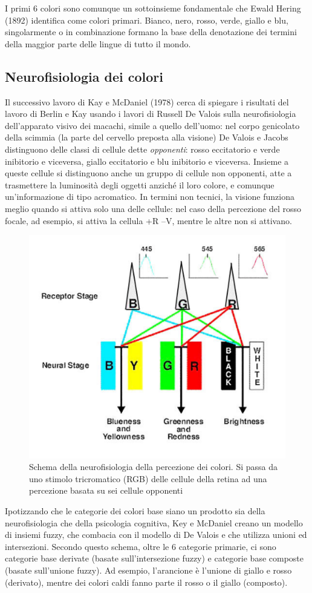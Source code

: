 I primi 6 colori sono comunque un sottoinsieme fondamentale che Ewald Hering (1892) identifica come colori primari. Bianco, nero, rosso, verde, giallo e blu, singolarmente o in combinazione formano la base della denotazione dei termini della maggior parte delle lingue di tutto il mondo.

\subsection{Neurofisiologia dei colori}
Il successivo lavoro di Kay e McDaniel (1978) cerca di spiegare i risultati del lavoro di Berlin e Kay usando i lavori di Russell De Valois sulla neurofisiologia dell’apparato visivo dei macachi, simile a quello dell’uomo: nel corpo genicolato della scimmia (la parte del cervello preposta alla visione) De Valois e Jacobs distinguono delle classi di cellule dette \emph{opponenti}: rosso eccitatorio e verde inibitorio e viceversa, giallo eccitatorio e blu inibitorio e viceversa. Insieme a queste cellule si distinguono anche un gruppo di cellule non opponenti, atte a trasmettere la luminosità degli oggetti anziché il loro colore, e comunque un’informazione di tipo acromatico. In termini non tecnici, la visione funziona meglio quando si attiva solo una delle cellule: nel caso della percezione del rosso focale, ad esempio, si attiva la cellula +R –V, mentre le altre non si attivano.

\begin{figure}[hbt]
  \centering
  \includegraphics[width=.5\textwidth]{img/neurofisiologia-colori.png}
  \caption{Schema della neurofisiologia della percezione dei colori. Si passa da uno stimolo tricromatico (RGB) delle cellule della retina ad una percezione basata su sei cellule opponenti}
  \label{fig:neurofisiologia}
\end{figure}

Ipotizzando che le categorie dei colori base siano un prodotto sia della neurofisiologia che della psicologia cognitiva, Key e McDaniel creano un modello di insiemi fuzzy, che combacia con il modello di De Valois e che utilizza unioni ed intersezioni. Secondo questo schema, oltre le 6 categorie primarie, ci sono categorie base derivate (basate sull’intersezione fuzzy) e categorie base composte (basate sull’unione fuzzy). Ad esempio, l’arancione è l’unione di giallo e rosso (derivato), mentre dei colori caldi fanno parte il rosso o il giallo (composto).


